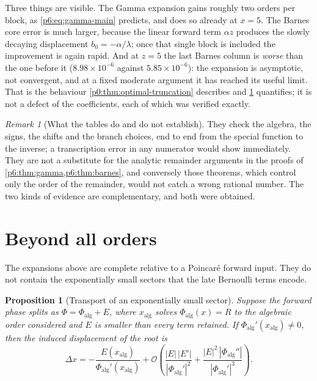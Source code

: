 \documentclass[11pt,a4paper,oneside]{book}
\theoremstyle{plain}
\newtheorem{proposition}[theorem]{Proposition}
\theoremstyle{definition}
\theoremstyle{remark}
\newtheorem{remark}[theorem]{Remark}
\newcommand{\bigO}{\mathcal{O}}
\begin{document}
Three things are visible.  The Gamma expansion gains roughly two orders per
block, as \eqref{p6:eq:gamma-main} predicts, and does so already at $x=5$.
The Barnes core error is much larger, because the linear forward term
$\alpha z$ produces the slowly decaying displacement $b_0=-\alpha/\lambda$;
once that single block is included the improvement is again rapid.  And at
$z=5$ the last Barnes column is \emph{worse} than the one before it
($8.98\times10^{-6}$ against $5.85\times10^{-6}$): the expansion is asymptotic,
not convergent, and at a fixed moderate argument it has reached its useful
limit.  That is the behaviour \cref{p0:thm:optimal-truncation} describes and
\cref{p6:sec:exponential} quantifies; it is not a defect of the coefficients,
each of which was verified exactly.

\begin{remark}[What the tables do and do not establish]
\label{p6:rem:tables-caveat}
They check the algebra, the signs, the shifts and the branch choices, end to
end from the special function to the inverse; a transcription error in any
numerator would show immediately.  They are not a substitute for the analytic
remainder arguments in the proofs of
\cref{p6:thm:gamma,p6:thm:barnes}, and conversely those theorems, which
control only the order of the remainder, would not catch a wrong rational
number.  The two kinds of evidence are complementary, and both were obtained.
\end{remark}

\section{Beyond all orders}
\label{p6:sec:exponential}

The expansions above are complete relative to a Poincar\'e forward input.
They do not contain the exponentially small sectors that the late Bernoulli
terms encode.

\begin{proposition}[Transport of an exponentially small sector]
\label{p6:prop:exponential-transport}
Suppose the forward phase splits as $\Phi=\Phi_{\mathrm{alg}}+E$, where
$x_{\mathrm{alg}}$ solves $\Phi_{\mathrm{alg}}(x)=R$ to the algebraic order
considered and $E$ is smaller than every term retained.  If
$\Phi_{\mathrm{alg}}'(x_{\mathrm{alg}})\ne0$, then the induced displacement of
the root is
\begin{equation}\label{p6:eq:exponential-transport}
 \Delta x
 =-\frac{E(x_{\mathrm{alg}})}{\Phi_{\mathrm{alg}}'(x_{\mathrm{alg}})}
 +\bigO\!\left(
 \frac{|E|\,|E'|}{|\Phi_{\mathrm{alg}}'|^{2}}
 +\frac{|E|^{2}\,|\Phi_{\mathrm{alg}}''|}{|\Phi_{\mathrm{alg}}'|^{3}}
 \right).
\end{equation}
\end{proposition}
\end{document}
